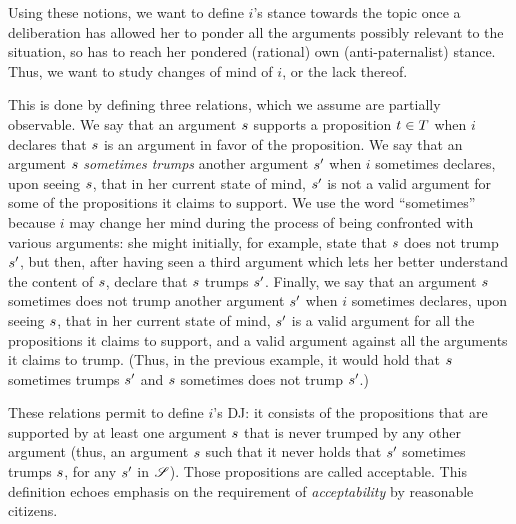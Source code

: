\documentclass[version=3.21, pagesize, twoside=off, bibliography=totoc, DIV=calc, fontsize=12pt, a4paper, french, english]{scrartcl}
\begin{document}
Using these notions, we want to define $i$’s stance towards the topic once a deliberation has allowed her to ponder all the arguments possibly relevant to the situation, so has to reach her pondered (rational) own (anti-paternalist) stance. 
Thus, we want to study changes of mind of $i$, or the lack thereof.

This is done by defining three relations, which we assume are partially observable. We say that an argument $s$ supports a proposition $t \in T$ when $i$ declares that $s$ is an argument in favor of the proposition. We say that an argument $s$ \emph{sometimes trumps} another argument $s'$ when $i$ sometimes declares, upon seeing $s$, that in her current state of mind, $s'$ is not a valid argument for some of the propositions it claims to support. We use the word “sometimes” because $i$ may change her mind during the process of being confronted with various arguments: she might initially, for example, state that $s$ does not trump $s'$, but then, after having seen a third argument which lets her better understand the content of $s$, declare that $s$ trumps $s'$. Finally, we say that an argument $s$ sometimes does not trump another argument $s'$ when $i$ sometimes declares, upon seeing $s$, that in her current state of mind, $s'$ is a valid argument for all the propositions it claims to support, and a valid argument against all the arguments it claims to trump. (Thus, in the previous example, it would hold that $s$ sometimes trumps $s'$ and $s$ sometimes does not trump $s'$.)

These relations permit to define $i$'s \ac{DJ}: it consists of the propositions that are supported by at least one argument $s$ that is never trumped by any other argument (thus, an argument $s$ such that it never holds that $s'$ sometimes trumps $s$, for any $s'$ in $\mathscr{S}$). Those propositions are called acceptable. This definition echoes  emphasis on the requirement of \emph{acceptability} by reasonable citizens. 
\end{document}
